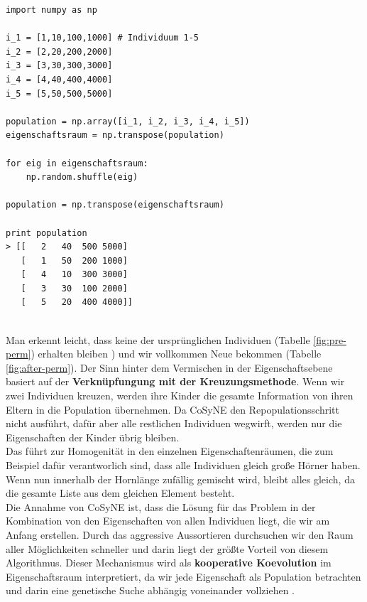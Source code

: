             \begin{mdframed}
            \begin{verbatim}
import numpy as np

i_1 = [1,10,100,1000] # Individuum 1-5
i_2 = [2,20,200,2000]
i_3 = [3,30,300,3000]
i_4 = [4,40,400,4000]
i_5 = [5,50,500,5000]

population = np.array([i_1, i_2, i_3, i_4, i_5])
eigenschaftsraum = np.transpose(population)
  
for eig in eigenschaftsraum:
    np.random.shuffle(eig)

population = np.transpose(eigenschaftsraum)

print population
> [[   2   40  500 5000]
   [   1   50  200 1000]
   [   4   10  300 3000]
   [   3   30  100 2000]
   [   5   20  400 4000]]

            \end{verbatim}
            \end{mdframed}
            \hfill \\[1mm]
            \noindent
            Man erkennt leicht, dass keine der ursprünglichen Individuen (Tabelle \ref{fig:pre-perm}) erhalten bleiben ) und wir vollkommen Neue bekommen (Tabelle \ref{fig:after-perm}). Der Sinn hinter dem Vermischen in der Eigenschaftsebene basiert auf der \textbf{Verknüpfungung mit der Kreuzungsmethode}.
            \newpage
            \noindent
            Wenn wir zwei Individuen kreuzen, werden ihre Kinder die gesamte Information von ihren Eltern in die Population übernehmen. Da CoSyNE den Repopulationsschritt nicht ausführt, dafür aber alle restlichen Individuen wegwirft, werden nur die Eigenschaften der Kinder übrig bleiben.\\

            \noindent
            Das führt zur Homogenität in den einzelnen Eigenschaftenräumen, die zum Beispiel dafür verantworlich sind, dass alle Individuen gleich große Hörner haben. Wenn nun innerhalb der Hornlänge zufällig gemischt wird, bleibt alles gleich, da die gesamte Liste aus dem gleichen Element besteht. \\

            \noindent
            Die Annahme von CoSyNE ist, dass die Lösung für das Problem in der Kombination von den Eigenschaften von allen Individuen liegt, die wir am Anfang erstellen. Durch das aggressive Aussortieren durchsuchen wir den Raum aller Möglichkeiten schneller und darin liegt der größte Vorteil von diesem Algorithmus. Dieser Mechanismus wird als \textbf{kooperative Koevolution} im Eigenschaftsraum interpretiert, da wir jede Eigenschaft als Population betrachten und darin eine genetische Suche abhängig voneinander vollziehen \cite{cosyne2}. \\

